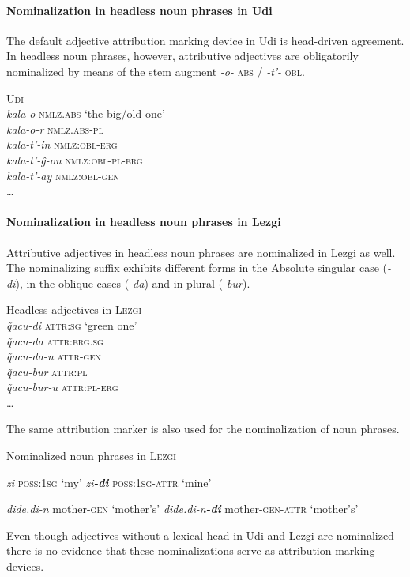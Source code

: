 \paragraph{Nominalization in headless noun phrases in Udi}
The default adjective attribution marking device in Udi is head-driven agreement. In headless noun phrases, however, attributive adjectives are obligatorily nominalized by means of the stem augment \textit{-o-} \textsc{abs} / \textit{-t'-} \textsc{obl}.
\begin{exe}
\ex \textsc{Udi} \citep[466]{schulze-furhoff1994}\\
\textit{kala-o} \textsc{nmlz.abs} ‘the big/old one’\\
\textit{kala-o-r} \textsc{nmlz.abs}-\textsc{pl}\\
\textit{kala-t'-in} \textsc{nmlz:obl}-\textsc{erg}\\
\textit{kala-t'-ĝ-on} \textsc{nmlz:obl}-\textsc{pl}-\textsc{erg}\\
\textit{kala-t'-ay} \textsc{nmlz:obl}-\textsc{gen}\\
\dots
\end{exe}

\paragraph{Nominalization in headless noun phrases in Lezgi}
Attributive adjectives in headless noun phrases are nominalized in Lezgi as well. The nominalizing suffix exhibits different forms in the Absolute singular case (\textit{-di}), in the oblique cases (\textit{-da}) and in plural (\textit{-bur}).
\begin{exe}
\ex Headless adjectives in \textsc{Lezgi} \citep[110]{haspelmath1993}\\
\textit{q̃acu-di} \textsc{attr:sg} ‘green one’\\
\textit{q̃acu-da} \textsc{attr:erg.sg}\\
\textit{q̃acu-da-n} \textsc{attr}-\textsc{gen}\\
\textit{q̃acu-bur} \textsc{attr:pl}\\
\textit{q̃acu-bur-u} \textsc{attr:pl}-\textsc{erg}\\
\dots
\end{exe}
The same attribution marker is also used for the nominalization of noun phrases.
\begin{exe}
\ex Nominalized noun phrases in \textsc{Lezgi} \citep[110]{haspelmath1993}
\begin{xlist}
\ex 
\begin{xlist}
\ex\textit{zi} \textsc{poss:1sg} ‘my’
\ex \textit{zi\textbf{-di}} \textsc{poss:1sg}-\textsc{attr} ‘mine’
\end{xlist}
\ex
\begin{xlist}
\ex \textit{dide.di-n} mother-\textsc{gen} ‘mother's’
\ex \textit{dide.di-n\textbf{-di}} mother-\textsc{gen}-\textsc{attr} ‘mother's’
\end{xlist}
\end{xlist}
\end{exe}
Even though adjectives without a lexical head in Udi and Lezgi are nominalized there is no evidence that these nominalizations serve as attribution marking devices.

